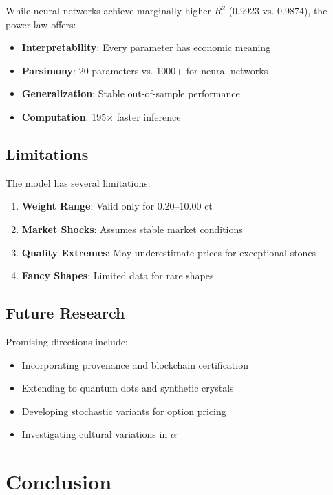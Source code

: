 \documentclass[12pt,a4paper]{article}
\begin{document}
While neural networks achieve marginally higher $R^2$ (0.9923 vs. 0.9874), the power-law offers:

\begin{itemize}
    \item \textbf{Interpretability}: Every parameter has economic meaning
    \item \textbf{Parsimony}: 20 parameters vs. 1000+ for neural networks
    \item \textbf{Generalization}: Stable out-of-sample performance
    \item \textbf{Computation}: 195× faster inference
\end{itemize}

\subsection{Limitations}

The model has several limitations:

\begin{enumerate}
    \item \textbf{Weight Range}: Valid only for 0.20--10.00 ct
    \item \textbf{Market Shocks}: Assumes stable market conditions
    \item \textbf{Quality Extremes}: May underestimate prices for exceptional stones
    \item \textbf{Fancy Shapes}: Limited data for rare shapes
\end{enumerate}

\subsection{Future Research}

Promising directions include:

\begin{itemize}
    \item Incorporating provenance and blockchain certification
    \item Extending to quantum dots and synthetic crystals
    \item Developing stochastic variants for option pricing
    \item Investigating cultural variations in $\alpha$
\end{itemize}

\section{Conclusion}
\label{sec:conclusion}
\end{document}
